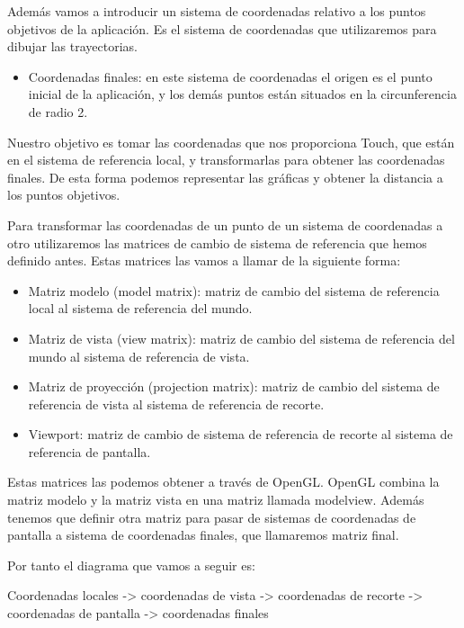 \documentclass[a4paper,11pt, oneside]{book}
\begin{document}
Además vamos a introducir un sistema de coordenadas relativo a los puntos objetivos de la aplicación. Es el sistema de coordenadas que utilizaremos para dibujar las trayectorias.

\begin{itemize}
	\item Coordenadas finales: en este sistema de coordenadas el origen es el punto inicial de la aplicación, y los demás puntos están situados en la circunferencia de radio 2.
\end{itemize}

Nuestro objetivo es tomar las coordenadas que nos proporciona Touch, que están en el sistema de referencia local, y transformarlas para obtener las coordenadas finales. De esta forma podemos representar las gráficas y obtener la distancia a los puntos objetivos.

Para transformar las coordenadas de un punto de un sistema de coordenadas a otro utilizaremos las matrices de cambio de sistema de referencia que hemos definido antes. Estas matrices las vamos a llamar de la siguiente forma:
\begin{itemize}
	\item Matriz modelo (model matrix): matriz de cambio del sistema de referencia local al sistema de referencia del mundo.
	\item Matriz de vista (view matrix): matriz de cambio del sistema de referencia del mundo al sistema de referencia de vista.
	\item Matriz de proyección (projection matrix): matriz de cambio del sistema de referencia de vista al sistema de referencia de recorte.
	\item Viewport: matriz de cambio de sistema de referencia de recorte al sistema de referencia de pantalla.
\end{itemize}

Estas matrices las podemos obtener a través de OpenGL. OpenGL combina la matriz modelo y la matriz vista en una matriz llamada modelview. Además tenemos que definir otra matriz para pasar de sistemas de coordenadas de pantalla a sistema de coordenadas finales, que llamaremos matriz final.

Por tanto el diagrama que vamos a seguir es:

Coordenadas locales -> coordenadas de vista -> coordenadas de recorte -> coordenadas de pantalla -> coordenadas finales
\end{document}
